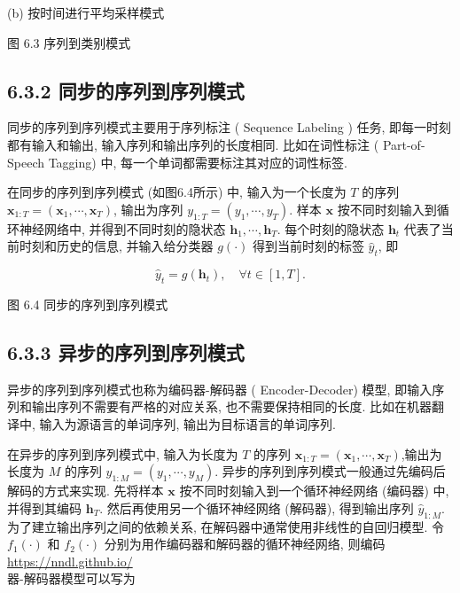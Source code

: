 \documentclass[10pt]{article}
\begin{document}
(b) 按时间进行平均采样模式

图 6.3 序列到类别模式

\subsection*{6.3.2 同步的序列到序列模式}
同步的序列到序列模式主要用于序列标注 ( Sequence Labeling ) 任务, 即每一时刻都有输入和输出, 输入序列和输出序列的长度相同. 比如在词性标注 ( Part-of-Speech Tagging) 中, 每一个单词都需要标注其对应的词性标签.

在同步的序列到序列模式 (如图6.4所示) 中, 输入为一个长度为 $T$ 的序列 $\boldsymbol{x}_{1: T}=\left(\boldsymbol{x}_{1}, \cdots, \boldsymbol{x}_{T}\right)$, 输出为序列 $y_{1: T}=\left(y_{1}, \cdots, y_{T}\right)$. 样本 $\boldsymbol{x}$ 按不同时刻输入到循环神经网络中, 并得到不同时刻的隐状态 $\boldsymbol{h}_{1}, \cdots, \boldsymbol{h}_{T}$. 每个时刻的隐状态 $\boldsymbol{h}_{t}$ 代表了当前时刻和历史的信息, 并输入给分类器 $g(\cdot)$ 得到当前时刻的标签 $\hat{y}_{t}$, 即


\begin{equation*}
\hat{y}_{t}=g\left(\boldsymbol{h}_{t}\right), \quad \forall t \in[1, T] . \tag{6.24}
\end{equation*}




图 6.4 同步的序列到序列模式

\subsection*{6.3.3 异步的序列到序列模式}
异步的序列到序列模式也称为编码器-解码器 ( Encoder-Decoder) 模型, 即输入序列和输出序列不需要有严格的对应关系, 也不需要保持相同的长度. 比如在机器翻译中, 输入为源语言的单词序列, 输出为目标语言的单词序列.

在异步的序列到序列模式中, 输入为长度为 $T$ 的序列 $\boldsymbol{x}_{1: T}=\left(\boldsymbol{x}_{1}, \cdots, \boldsymbol{x}_{T}\right)$,输出为长度为 $M$ 的序列 $y_{1: M}=\left(y_{1}, \cdots, y_{M}\right)$. 异步的序列到序列模式一般通过先编码后解码的方式来实现. 先将样本 $\boldsymbol{x}$ 按不同时刻输入到一个循环神经网络 (编码器) 中, 并得到其编码 $\boldsymbol{h}_{T}$. 然后再使用另一个循环神经网络 (解码器), 得到输出序列 $\hat{y}_{1: M}$. 为了建立输出序列之间的依赖关系, 在解码器中通常使用非线性的自回归模型. 令 $f_{1}(\cdot)$ 和 $f_{2}(\cdot)$ 分别为用作编码器和解码器的循环神经网络, 则编码 \href{https://nndl.github.io/}{https://nndl.github.io/}\\
器-解码器模型可以写为
\end{document}

